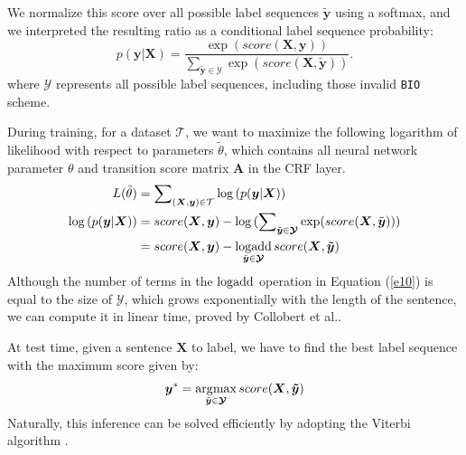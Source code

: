 We normalize this score over all possible label sequences $\tilde{\bm{y}}$ using a softmax, and we interpreted the resulting ratio as a conditional label sequence probability:
\begin{equation}
	p(\bm{y}|\bm{X})=\frac{\exp({score(\bm{X}, \bm{y})})}{\sum\nolimits_{\tilde{\bm{y}} \in \bm{\mathcal{Y}}} \exp({score(\bm{X}, \tilde{\bm{y}})})}.
\end{equation}
where $\bm{\mathcal{Y}}$ represents all possible label sequences, including those invalid \texttt{BIO} scheme.

During training, for a dataset $\mathcal{T}$, we want to maximize the following logarithm of likelihood with respect to parameters $\tilde{\theta}$, which contains all neural network parameter $\theta$ and transition score matrix $\bm{A}$ in the CRF layer.
\begin{align}
L(\tilde{\theta}) &= \sum\nolimits_{(\bm{X}, \bm{y}) \in \mathcal{T}}{\log{(p(\bm{y}|\bm{X}))}} \\
\log{(p(\bm{y}|\bm{X}))} &= score(\bm{X}, \bm{y}) - \log{(\sum\nolimits_{\tilde{\bm{y}} \in \bm{\mathcal{Y}}} \exp({score(\bm{X}, \tilde{\bm{y}})}))} \notag	 \\
\label{e10}
&= score(\bm{X}, \bm{y}) - \logadd\limits_{\tilde{\bm{y}} \in \bm{\mathcal{Y}}}score(\bm{X}, \bm{\tilde{y}})
\end{align}
Although the number of terms in the $\operatorname*{\log\!\mathrm{add}}$ operation in Equation (\ref{e10}) is equal to the size of $\bm{\mathcal{Y}}$, which grows exponentially with the length of the sentence, we can compute it in linear time, proved by Collobert et al..

At test time, given a sentence $\bm{X}$ to label, we have to find the best label sequence with the maximum score given by:
\begin{equation}
	\bm{y}^* = \argmax\limits_{\tilde{\bm{y}} \in \bm{\mathcal{Y}}}score(\bm{X}, \bm{\tilde{y}})
\end{equation}
Naturally, this inference can be solved efficiently by adopting the Viterbi algorithm \cite{rabiner1989tutorial}.
